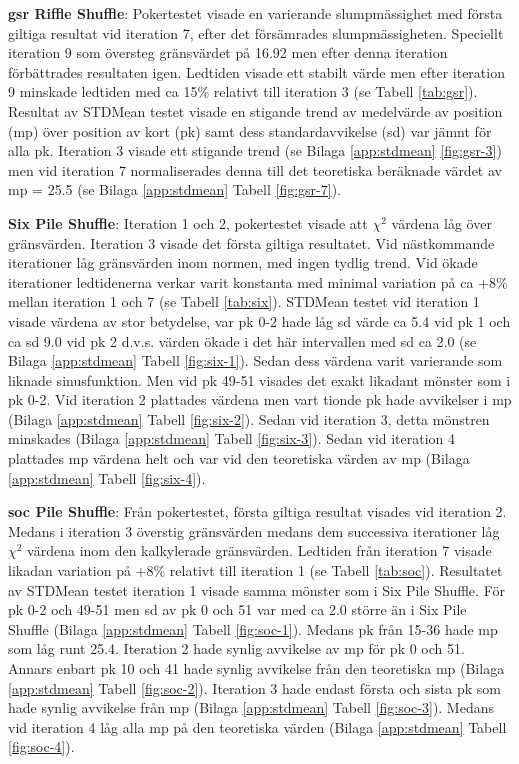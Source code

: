 \documentclass[swedish,a4paper]{article}
\begin{document}
\textbf{\gls{gsr} Riffle Shuffle}: Pokertestet visade en varierande slumpmässighet
med första giltiga resultat vid iteration 7, efter det försämrades slumpmässigheten.
Speciellt iteration 9 som översteg gränsvärdet på 16.92 men efter denna iteration förbättrades
resultaten igen. Ledtiden visade ett stabilt värde men efter iteration 9 minskade
ledtiden med ca 15\% relativt till iteration 3 (se Tabell
\ref{tab:gsr}).
Resultat av STDMean testet visade en stigande trend av medelvärde av position
(\gls{mp}) över position av kort (\gls{pk}) samt dess standardavvikelse
(\gls{sd}) var jämnt för alla \gls{pk}. Iteration 3 visade ett stigande trend (se
Bilaga \ref{app:stdmean} \ref{fig:gsr-3}) men vid iteration 7 normaliserades denna
till det teoretiska beräknade värdet av \gls{mp} = 25.5 (se Bilaga
\ref{app:stdmean} Tabell \ref{fig:gsr-7}). 

\textbf{Six Pile Shuffle}: Iteration 1 och 2, pokertestet visade att $\chi^2$
värdena låg över gränsvärden. Iteration 3 visade det första giltiga resultatet.
Vid nästkommande iterationer låg gränsvärden inom normen, med ingen
tydlig trend. Vid ökade iterationer  ledtidenerna verkar varit konstanta med
minimal variation på ca +8\% mellan iteration 1 och 7 (se Tabell \ref{tab:six}).
STDMean testet vid iteration 1 visade värdena av stor betydelse, var \gls{pk} 0-2
hade låg \gls{sd} värde ca 5.4 vid \gls{pk} 1 och ca \gls{sd} 9.0 vid \gls{pk} 2
d.v.s. värden ökade i det här intervallen med \gls{sd} ca 2.0
(se Bilaga \ref{app:stdmean} Tabell  \ref{fig:six-1}).
Sedan dess värdena varit varierande som liknade sinusfunktion. Men vid \gls{pk}
49-51 visades det exakt likadant mönster som i \gls{pk} 0-2. Vid iteration 2 plattades
värdena men vart tionde \gls{pk} hade avvikelser i \gls{mp} 
(Bilaga \ref{app:stdmean} Tabell  \ref{fig:six-2}). Sedan vid iteration 3, detta
mönstren minskades (Bilaga \ref{app:stdmean} Tabell \ref{fig:six-3}).
Sedan vid iteration 4 plattades \gls{mp} värdena helt och var
vid den teoretiska värden av \gls{mp} (Bilaga \ref{app:stdmean} Tabell \ref{fig:six-4}).

\textbf{\gls{soc} Pile Shuffle}: Från pokertestet, första giltiga resultat
visades vid iteration 2. Medans i iteration 3 överstig gränsvärden medans dem
successiva iterationer låg $\chi^2$ värdena inom den kalkylerade gränsvärden.
Ledtiden från iteration 7 visade likadan  variation på +8\% relativt till
iteration 1 (se Tabell \ref{tab:soc}). Resultatet av STDMean testet iteration 1
visade samma mönster som i Six Pile Shuffle. För \gls{pk} 0-2 och 49-51 men
\gls{sd} av \gls{pk} 0 och 51 var med ca 2.0 större än i Six Pile Shuffle
(Bilaga \ref{app:stdmean} Tabell \ref{fig:soc-1}). Medans \gls{pk} från 15-36
hade \gls{mp} som låg runt 25.4. Iteration 2 hade synlig avvikelse av \gls{mp}
för \gls{pk} 0 och 51. Annars enbart \gls{pk} 10 och 41 hade synlig avvikelse
från den teoretiska \gls{mp} (Bilaga \ref{app:stdmean} Tabell \ref{fig:soc-2}).
Iteration 3 hade endast första och sista \gls{pk} som hade synlig avvikelse från
\gls{mp} (Bilaga \ref{app:stdmean} Tabell \ref{fig:soc-3}). Medans vid iteration
4 låg alla \gls{mp} på den teoretiska värden (Bilaga \ref{app:stdmean} Tabell
\ref{fig:soc-4}).
\end{document}
